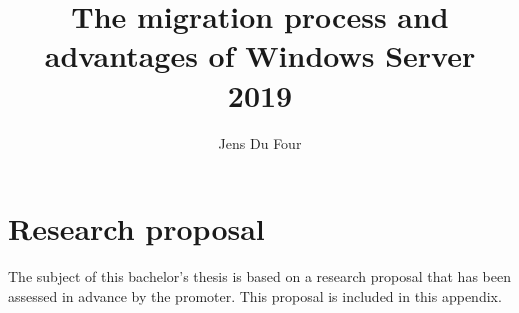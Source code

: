 \documentclass{bachproef-tin}
\title{The migration process and advantages of Windows Server 2019}
\author{Jens Du Four}
\begin{document}
	
\inserttitlepage
\usechapterimagefalse


\pagestyle{empty} %
\tableofcontents  %
\cleardoublepage  %
\pagestyle{fancy} %
%
%
\listoffigures
\listoftables
\printnoidxglossaries





\appendix
\renewcommand{\chaptername}{Appendix} 
\chapter{Research proposal}
The subject of this bachelor's thesis is based on a research proposal that has been assessed in advance by the promoter. This proposal is included in this appendix.

\end{document}
